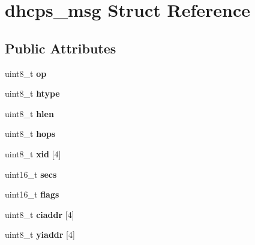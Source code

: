 \hypertarget{structdhcps__msg}{}\section{dhcps\+\_\+msg Struct Reference}
\label{structdhcps__msg}
\subsection*{Public Attributes}
\begin{DoxyCompactItemize}
\item 
\hypertarget{structdhcps__msg_a09df11b5e009ebc7ecf7b97d07de6cb2}{}uint8\+\_\+t {\bfseries op}\label{structdhcps__msg_a09df11b5e009ebc7ecf7b97d07de6cb2}

\item 
\hypertarget{structdhcps__msg_a7a2065a67b9490d40ba2150582e5b7fe}{}uint8\+\_\+t {\bfseries htype}\label{structdhcps__msg_a7a2065a67b9490d40ba2150582e5b7fe}

\item 
\hypertarget{structdhcps__msg_a66ad803d7d8b515703eb1eccc78e1169}{}uint8\+\_\+t {\bfseries hlen}\label{structdhcps__msg_a66ad803d7d8b515703eb1eccc78e1169}

\item 
\hypertarget{structdhcps__msg_a38e1eaffaf9c0704575326c682463962}{}uint8\+\_\+t {\bfseries hops}\label{structdhcps__msg_a38e1eaffaf9c0704575326c682463962}

\item 
\hypertarget{structdhcps__msg_ad7467887b13b869f299e29df8cb6ec83}{}uint8\+\_\+t {\bfseries xid} \mbox{[}4\mbox{]}\label{structdhcps__msg_ad7467887b13b869f299e29df8cb6ec83}

\item 
\hypertarget{structdhcps__msg_a90b2c88d35a395c8d64753387f8ef467}{}uint16\+\_\+t {\bfseries secs}\label{structdhcps__msg_a90b2c88d35a395c8d64753387f8ef467}

\item 
\hypertarget{structdhcps__msg_a66dd2318b7f49f2f6010c0e649c50060}{}uint16\+\_\+t {\bfseries flags}\label{structdhcps__msg_a66dd2318b7f49f2f6010c0e649c50060}

\item 
\hypertarget{structdhcps__msg_acdac0ca224de1b070dcff6ca700827b5}{}uint8\+\_\+t {\bfseries ciaddr} \mbox{[}4\mbox{]}\label{structdhcps__msg_acdac0ca224de1b070dcff6ca700827b5}

\item 
\hypertarget{structdhcps__msg_a906900ceeb4a41eea74d01da620fb0d6}{}uint8\+\_\+t {\bfseries yiaddr} \mbox{[}4\mbox{]}\label{structdhcps__msg_a906900ceeb4a41eea74d01da620fb0d6}


\end{DoxyCompactItemize}

